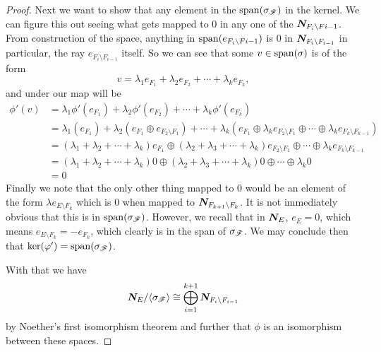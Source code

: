 \documentclass[12pt,oneside]{../../sfsuthesis}
\begin{document}
\begin{proof}
    Next we want to show that any element in the \( \operatorname{span}(\sigma_{\mathscr{F}}) \) in the kernel.
    We can figure this out seeing what gets mapped to 0 in any one of the \( \bm{N}_{F_i \setminus F i-1} \).
    From construction of the space, anything in \( \operatorname{span}( e_{F_i \setminus F{i-1}}) \) is 0 in \( \bm{N}_{F_i \setminus F_{i-1}} \) in particular, the ray \( e_{F_i \setminus F_{i-1}} \) itself.
    So we can see that some \( v \in \operatorname{span}( \sigma ) \) is of the form
    \[
        v = \lambda_1 e_{F_1} + \lambda_2 e_{F_2} + \cdots + \lambda_k e_{F_k},
    \]
    and under our map will be
    \begin{align*}
        \phi'(v) & = \lambda_1 \phi'(e_{F_1}) + \lambda_2 \phi'(e_{F_2}) + \cdots + \lambda_k \phi'(e_{F_k})                                                                                                                                                 \\
                 & = \lambda_1 \left(e_{F_1}\right) + \lambda_2 \left(e_{F_1} \oplus  e_{F_2 \setminus F_1}\right) + \cdots + \lambda_k \left(e_{F_1} \oplus \lambda_k e_{F_2 \setminus F_1} \oplus \cdots \oplus \lambda_k e_{F_k \setminus F_{k-1}}\right) \\
                 & = (\lambda_1 + \lambda_2 + \cdots + \lambda_k) e_{F_1} \oplus (\lambda_2 + \lambda_3 + \cdots + \lambda_k) e_{F_2 \setminus F_1} \oplus \cdots \oplus \lambda_k e_{F_k \setminus F_{k-1}}                                                 \\
                 & = (\lambda_1 + \lambda_2 + \cdots + \lambda_k) 0 \oplus (\lambda_2 + \lambda_3 + \cdots + \lambda_k) 0 \oplus \cdots \oplus \lambda_k 0                                                                                                   \\
                 & = 0
    \end{align*}
    Finally we note that the only other thing mapped to 0 would be an element of the form \( \lambda e_{E \setminus F_k} \) which is 0 when mapped to \( \bm{N}_{F_{k+1} \setminus F_k} \).
    It is not immediately obvious that this is in \( \operatorname{span}(\sigma_{\mathscr{F}}) \).
    However, we recall that in \( \bm{N}_E  \), \( e_E = 0 \), which means \( e_{E \setminus F_k} = -e_{F_k} \), which clearly is in the span of \( \sigma_{\mathscr{F}} \).
    We may conclude then that \( \ker( \varphi' ) = \operatorname{span}(\sigma_{\mathscr{F}}) \).

    With that we have
    \[
        \bm{N}_E/\langle \sigma_{\mathscr{F}} \rangle \cong \bigoplus_{i=1}^{k+1} \bm{N}_{F_i \setminus F_{i-1}}
    \]
    by Noether's first isomorphism theorem and further that \( \phi \) is an isomorphism between these spaces.
\end{proof}
\end{document}
